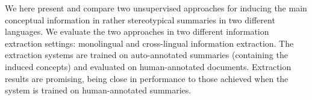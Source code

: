 We here present and compare two unsupervised approaches for inducing the main conceptual information in rather stereotypical summaries in two different
 languages. 
 We evaluate the two approaches in two different information extraction
 settings: monolingual and cross-lingual information extraction. 
 The extraction systems are trained on  auto-annotated summaries
  (containing the induced concepts)  and evaluated on human-annotated 
 documents. Extraction results are promising, being close in performance to 
  those achieved when the system is trained on  human-annotated summaries.

